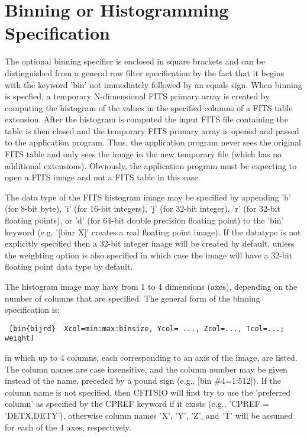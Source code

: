 \documentclass[11pt]{book}
\begin{document}
\section{ Binning or Histogramming Specification}

The optional binning specifier is enclosed in square brackets and can
be distinguished from a general row filter specification by the fact
that it begins with the keyword 'bin'  not immediately followed by an
equals sign.  When binning is specfied, a temporary N-dimensional FITS
primary array is created by computing the histogram of the values in
the specified columns of a FITS table extension.  After the histogram
is computed the input FITS file containing the table is then closed and
the temporary FITS primary array is opened and passed to the
application program.  Thus, the application program never sees the
original FITS table and only sees the image in the new temporary file
(which has no additional extensions).  Obviously, the application
program must be expecting to open a FITS image and not a FITS table in
this case.

The data type of the FITS histogram image may be specified by appending
'b' (for 8-bit byte), 'i' (for 16-bit integers), 'j' (for 32-bit
integer), 'r' (for 32-bit floating points), or 'd' (for 64-bit double
precision floating point)  to the 'bin' keyword (e.g. '[binr X]'
creates a real floating point image).  If the datatype is not
explicitly specified then a 32-bit integer image will be created by
default, unless the weighting option is also specified in which case
the image will have a 32-bit floating point data type by default.

The histogram image may have from 1 to 4 dimensions (axes), depending
on the number of columns that are specified.  The general form of the
binning specification is:

\begin{verbatim}
 [bin{bijrd}  Xcol=min:max:binsize, Ycol= ..., Zcol=..., Tcol=...; weight]
\end{verbatim}
in which up to 4 columns, each corresponding to an axis of the image,
are listed. The column names are case insensitive, and the column
number may be given instead of the name, preceded by a pound sign
(e.g., [bin \#4=1:512]).  If the column name is not specified, then
CFITSIO will first try to use the 'preferred column' as specified by
the CPREF keyword if it exists (e.g., 'CPREF = 'DETX,DETY'), otherwise
column names 'X', 'Y', 'Z', and 'T' will be assumed for each of the 4
axes, respectively.
\end{document}
